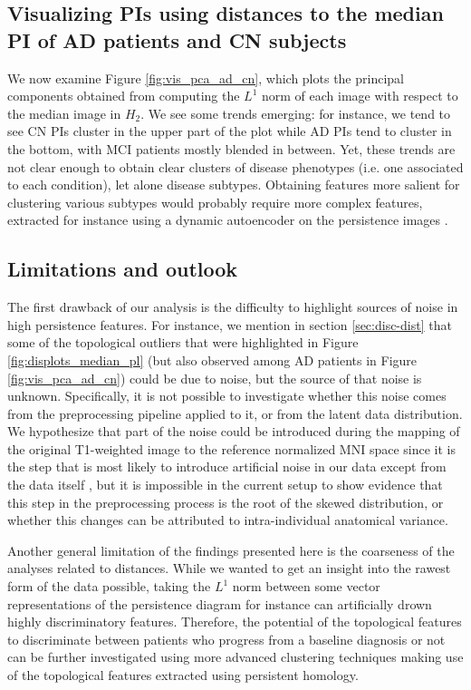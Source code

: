 \documentclass{article}
\begin{document}
\subsection{Visualizing PIs using distances to the median PI of AD patients and CN subjects}

We now examine Figure \ref{fig:vis_pca_ad_cn}, which plots the principal components obtained from computing the $L^1$ norm of each image with respect to the median image in $H_2$. We see some trends emerging: for instance, we tend to see CN PIs cluster in the upper part of the plot while AD PIs tend to cluster in the bottom, with MCI patients mostly blended in between. Yet, these trends are not clear enough to obtain clear clusters of disease phenotypes (i.e. one associated to each condition), let alone disease subtypes. Obtaining features more salient for clustering various subtypes would probably require more complex features, extracted for instance using a dynamic autoencoder on the persistence images \citep{mrabah2019deep}.

\subsection{Limitations and outlook}

The first drawback of our analysis is the difficulty to highlight sources of noise in high persistence features. For instance, we mention in section \ref{sec:disc-dist} that some of the topological outliers that were highlighted in Figure \ref{fig:displots_median_pl} (but also observed among AD patients in Figure \ref{fig:vis_pca_ad_cn}) could be due to noise, but the source of that noise is unknown. Specifically, it is not possible to investigate whether this noise comes from the preprocessing pipeline applied to it, or from the latent data distribution. We hypothesize that part of the noise could be introduced during the mapping of the original T1-weighted image to the reference normalized MNI space since it is the step that is most likely to introduce artificial noise in our data except from the data itself \citep{collins19943d}, but it is impossible in the current setup to show evidence that this step in the preprocessing process is the root of the skewed distribution, or whether this changes can be attributed to intra-individual anatomical variance.

Another general limitation of the findings presented here is the coarseness of the analyses related to distances. While we wanted to get an insight into the rawest form of the data possible, taking the $L^1$ norm between some vector representations of the persistence diagram for instance can artificially drown highly discriminatory features. Therefore, the potential of the topological features to discriminate between patients who progress from a baseline diagnosis or not can be further investigated using more advanced clustering techniques making use of the topological features extracted using persistent homology.
\end{document}
